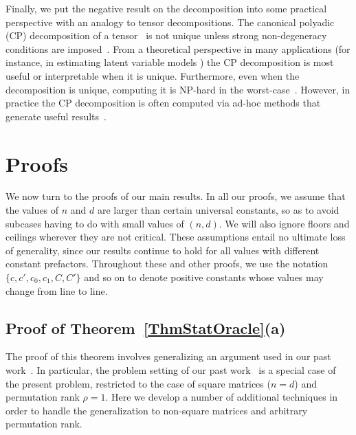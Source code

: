 \documentclass[11pt, hidelinks]{article} %
\newcommand{\numrows}{n}
\newcommand{\numcols}{d}
\newcommand{\permrank}{\rho}
\begin{document}
Finally, we put the negative result on the decomposition into some practical perspective with an analogy to tensor decompositions. The canonical polyadic (CP) decomposition of a tensor~\cite{hitchcock1927expression} is not unique unless strong non-degeneracy conditions are imposed~\cite{kruskal1977three}. From a theoretical perspective in many applications (for instance, in estimating latent variable models \cite{hsu2013learning}) the CP decomposition is most useful or interpretable when it is unique. Furthermore, even when the decomposition is unique, computing it is NP-hard in the worst-case~\cite{haastad1990tensor}. However, in practice the CP decomposition is often computed via ad-hoc methods that generate useful results~\cite{kolda2009tensor}.





\section{Proofs}
\label{SecProofs}

We now turn to the proofs of our main results.  In all our proofs, we
assume that the values of $\numrows$ and $\numcols$ are larger than
certain universal constants, so as to avoid subcases having to do with
small values of $(\numrows, \numcols)$. We will also ignore floors and ceilings wherever they are not critical. These assumptions entail no
ultimate loss of generality, since our results continue to hold for
all values with different constant prefactors. Throughout these and other proofs, we use the
notation $\{c, c', c_0, c_1, C, C' \}$ and so on to denote positive
constants whose values may change from line to line. 


\subsection{Proof of Theorem~\ref{ThmStatOracle}(a)}
\label{SecProofThmStatOracle}

The proof of this theorem involves generalizing an argument used in
our past work~\cite[Theorem 1]{shah2015stochastically}. In particular,
the problem setting of our past work~\cite[Theorem
  1]{shah2015stochastically} is a special case of the present problem,
restricted to the case of square matrices ($\numrows = \numcols$) and
permutation rank $\permrank = 1$.  Here we develop a number of
additional techniques in order to handle the generalization to
non-square matrices and arbitrary permutation rank.
\end{document}
